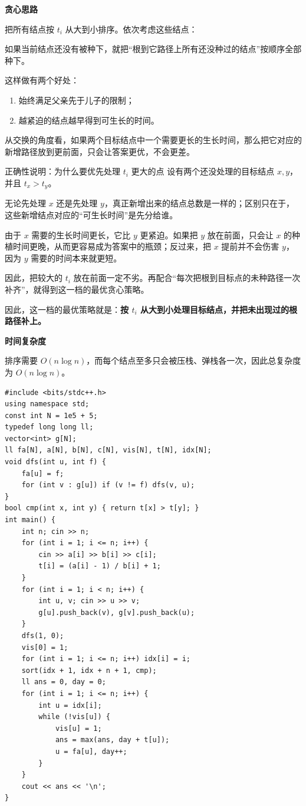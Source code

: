 \documentclass{book}
\begin{document}
\par\medskip
\noindent\textbf{贪心思路}
\par\medskip

    把所有结点按 $t_i$ 从大到小排序。依次考虑这些结点：

    如果当前结点还没有被种下，就把“根到它路径上所有还没种过的结点”按顺序全部种下。

    这样做有两个好处：

    \begin{enumerate}[leftmargin=2em,itemsep=1pt,topsep=2pt,parsep=0pt,partopsep=0pt]
        \item 始终满足父亲先于儿子的限制；
        \item 越紧迫的结点越早得到可生长的时间。
    \end{enumerate}

    从交换的角度看，如果两个目标结点中一个需要更长的生长时间，那么把它对应的新增路径放到更前面，只会让答案更优，不会更差。

    \begin{keybox}{正确性说明：为什么要优先处理 $t_i$ 更大的点}
        设有两个还没处理的目标结点 $x,y$，并且 $t_x > t_y$。

        无论先处理 $x$ 还是先处理 $y$，真正新增出来的结点总数是一样的；区别只在于，这些新增结点对应的“可生长时间”是先分给谁。

        由于 $x$ 需要的生长时间更长，它比 $y$ 更紧迫。如果把 $y$ 放在前面，只会让 $x$ 的种植时间更晚，从而更容易成为答案中的瓶颈；反过来，把 $x$ 提前并不会伤害 $y$，因为 $y$ 需要的时间本来就更短。

        因此，把较大的 $t_i$ 放在前面一定不劣。再配合“每次把根到目标点的未种路径一次补齐”，就得到这一档的最优贪心策略。
    \end{keybox}

    因此，这一档的最优策略就是：\textbf{按 $t_i$ 从大到小处理目标结点，并把未出现过的根路径补上。}

\par\medskip
\noindent\textbf{时间复杂度}
\par\medskip
    排序需要 $O(n \log n)$，而每个结点至多只会被压栈、弹栈各一次，因此总复杂度为 $O(n \log n)$。

\newpage
\begin{lstlisting}[style = code]
#include <bits/stdc++.h>
using namespace std;
const int N = 1e5 + 5;
typedef long long ll;
vector<int> g[N];
ll fa[N], a[N], b[N], c[N], vis[N], t[N], idx[N];
void dfs(int u, int f) {
    fa[u] = f;
    for (int v : g[u]) if (v != f) dfs(v, u);
}
bool cmp(int x, int y) { return t[x] > t[y]; }
int main() {
    int n; cin >> n;
    for (int i = 1; i <= n; i++) {
        cin >> a[i] >> b[i] >> c[i];
        t[i] = (a[i] - 1) / b[i] + 1;
    }
    for (int i = 1; i < n; i++) {
        int u, v; cin >> u >> v;
        g[u].push_back(v), g[v].push_back(u);
    }
    dfs(1, 0);
    vis[0] = 1;
    for (int i = 1; i <= n; i++) idx[i] = i;
    sort(idx + 1, idx + n + 1, cmp);
    ll ans = 0, day = 0;
    for (int i = 1; i <= n; i++) {
        int u = idx[i];
        while (!vis[u]) {
            vis[u] = 1;
            ans = max(ans, day + t[u]);
            u = fa[u], day++;
        }
    }
    cout << ans << '\n';
}
\end{lstlisting}
\end{document}
